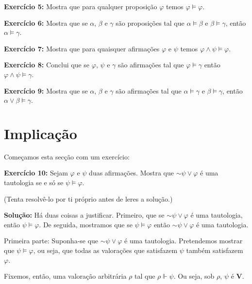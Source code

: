 \documentclass{article}
\theoremstyle{definition}
\theoremstyle{remark}
\newcommand{\V}{\mathbf{V}}
\newcommand*{\lneg}{\mathord{\sim}}
\begin{document}
	\textbf{Exercício 5:} Mostra que para qualquer proposição $\varphi$ temos $\varphi \vDash \varphi$.
	
	\smallskip
	
	\textbf{Exercício 6:} Mostra que se $\alpha$, $\beta$ e $\gamma$ são proposições tal que $\alpha \vDash \beta$ e $\beta \vDash \gamma$, então $\alpha \vDash \gamma$.
	
	\smallskip
	
	\textbf{Exercício 7:} Mostra que para quaisquer afirmações $\varphi$ e $\psi$ temos $\varphi \land \psi \vDash \varphi$.
	
	\smallskip
	
	\textbf{Exercício 8:} Conclui que se $\varphi$, $\psi$ e $\gamma$ são afirmações tal que $\varphi \vDash \gamma$ então $\varphi \land \psi \vDash \gamma$.
	
	\smallskip
	
	\textbf{Exercício 9:} Mostra que se $\alpha$, $\beta$ e $\gamma$ são afirmações tal que $\alpha \vDash \gamma$ e $\beta \vDash \gamma$, então $\alpha \lor \beta \vDash \gamma$.

	\smallskip
	
	\section{Implicação}
	
	Começamos esta secção com um exercício:
	
	\textbf{Exercício 10:} Sejam $\varphi$ e $\psi$ duas afirmações. Mostra que $\lneg \psi \lor \varphi$ é uma tautologia se e só se $\psi \vDash \varphi$.
	
	\smallskip
	
	(Tenta resolvê-lo por ti próprio antes de leres a solução.)
	
	\textbf{Solução:} Há duas coisas a justificar. Primeiro, que se $\lneg \psi \lor \varphi$ é uma tautologia, então $\psi \vDash \varphi$. De seguida, mostramos que se $\psi \vDash \varphi$ então $\lneg \psi \lor \varphi$ é uma tautologia.
	
	\smallskip
	
	Primeira parte: Suponha-se que $\lneg \psi \lor \varphi$ é uma tautologia. Pretendemos mostrar que $\psi \vDash \varphi$, ou seja, que todas as valorações que satisfazem $\psi$ também satisfazem $\varphi$.
	
	Fixemos, então, uma valoração arbitrária $\rho$ tal que $\rho \Vdash \psi$. Ou seja, sob $\rho$, $\psi$ é $\V$.
	
\end{document}
